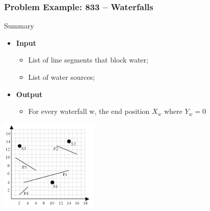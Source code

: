 \begin{frame}
  \frametitle{Problem Example: 833 -- Waterfalls}
    \begin{block}{Summary}
      \begin{itemize}
      \item {\bf Input}
      \begin{itemize}
        \item List of line segments that block water;
        \item List of water sources;
      \end{itemize}

      \item {\bf Output}
      \begin{itemize}
        \item For every waterfall w, the end position $X_w$ where $Y_w=0$
      \end{itemize}
      \end{itemize}
    \end{block}

    \includegraphics[width=0.35\textwidth]{img/waterfall}
\end{frame}

